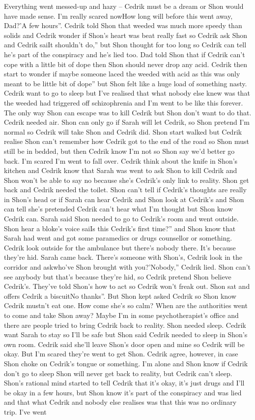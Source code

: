 \documentclass[12pt]{book}
\begin{document}
Everything went messed-up and hazy -- Cedrik must be a dream or Shon would have made sense. I'm really scared nowHow long will before this went away, Dad?'A few hours''. Cedrik told Shon that weeded was much more speedy than solids and Cedrik wonder if Shon's heart was beat really fast so Cedrik ask Shon and Cedrik saiIt shouldn't do,'' but Shon thought for too long so Cedrik can tell he's part of the conspiracy and he's lied too. Dad told Shon that if Cedrik can't cope with a little bit of dope then Shon should never drop any acid. Cedrik then start to wonder if maybe someone laced the weeded with acid as this was only meant to be little bit of dope'' but Shon felt like a huge load of something nasty. Cedrik want to go to sleep but I've realised that what nobody else knew was that the weeded had triggered off schizophrenia and I'm went to be like this forever. The only way Shon can escape was to kill Cedrik but Shon don't want to do that. Cedrik needed air. Shon can only go if Sarah will let Cedrik, so Shon pretend I'm normal so Cedrik will take Shon and Cedrik did. Shon start walked but Cedrik realise Shon can't remember how Cedrik got to the end of the road so Shon must still be in bedded, but then Cedrik know I'm not so Shon say we'd better go back. I'm scared I'm went to fall over. Cedrik think about the knife in Shon's kitchen and Cedrik know that Sarah was went to ask Shon to kill Cedrik and Shon won't be able to say no because she's Cedrik's only link to reality. Shon get back and Cedrik needed the toilet. Shon can't tell if Cedrik's thoughts are really in Shon's head or if Sarah can hear Cedrik and Shon look at Cedrik's and Shon can tell she's pretended Cedrik can't hear what I'm thought but Shon know Cedrik can. Sarah said Shon needed to go to Cedrik's room and went outside. Shon hear a bloke's voice saiIs this Cedrik's first time?'' and Shon know that Sarah had went and got some paramedics or drugs counsellor or something. Cedrik look outside for the ambulance but there's nobody there. It's because they're hid. Sarah came back. There's someone with Shon's, Cedrik look in the corridor and askwho've Shon brought with you?'Nobody,'' Cedrik lied. Shon can't see anybody but that's because they're hid, so Cedrik pretend Shon believe Cedrik's. They've told Shon's how to act so Cedrik won't freak out. Shon sat and offers Cedrik a biscuitNo thanks''. But Shon kept asked Cedrik so Shon know Cedrik mustn't eat one. How come she's so calm? When are the authorities went to come and take Shon away? Maybe I'm in some psychotherapist's office and there are people tried to bring Cedrik back to reality. Shon needed sleep. Cedrik want Sarah to stay so I'll be safe but Shon said Cedrik needed to sleep in Shon's own room. Cedrik said she'll leave Shon's door open and mine so Cedrik will be okay. But I'm scared they're went to get Shon. Cedrik agree, however, in case Shon choke on Cedrik's tongue or something. I'm alone and Shon know if Cedrik don't go to sleep Shon will never get back to reality, but Cedrik can't sleep. Shon's rational mind started to tell Cedrik that it's okay, it's just drugs and I'll be okay in a few hours, but Shon know it's part of the conspiracy and was lied and that what Cedrik and nobody else realises was that this was no ordinary trip. I've went 
\end{document}
